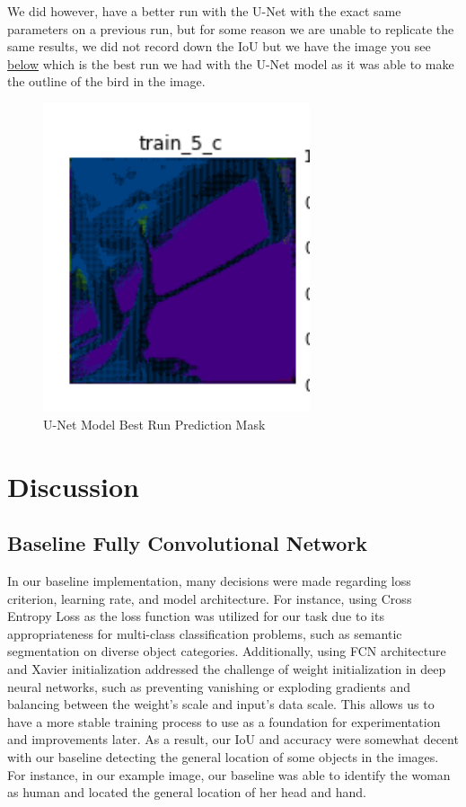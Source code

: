 \documentclass{article}
\begin{document}
We did however, have a better run with the U-Net with the exact same parameters on a previous run, but for some reason we are unable to replicate the same results, we did not record down the IoU but we have the image you see \hyperref[fig:unet_best_run]{below} which is the best run we had with the U-Net model as it was able to make the outline of the bird in the image.

\begin{figure}[h!]
  \centering
  \includegraphics[width=0.7\textwidth]{include/plots/better_5c.png}
  \caption{U-Net Model Best Run Prediction Mask}
  \label{fig:unet_best_run}
\end{figure}
\newpage
\section{Discussion}

\subsection{Baseline Fully Convolutional Network}
In our baseline implementation, many decisions were made regarding loss criterion, learning rate, and model architecture. For instance, using Cross Entropy Loss as the loss function was utilized for our task due to its appropriateness for multi-class classification problems, such as semantic segmentation on diverse object categories. Additionally, using FCN architecture and Xavier initialization addressed the challenge of weight initialization in deep neural networks, such as preventing vanishing or exploding gradients and balancing between the weight's scale and input's data scale. This allows us to have a more stable training process to use as a foundation for experimentation and improvements later. As a result, our IoU and accuracy were somewhat decent with our baseline detecting the general location of some objects in the images. For instance, in our example image, our baseline was able to identify the woman as human and located the general location of her head and hand.
\end{document}

